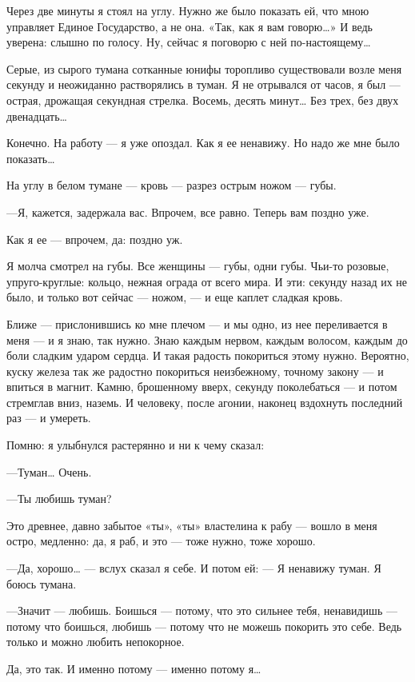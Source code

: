 \documentclass[11pt,openany]{book}
\begin{document}
Через две минуты я стоял на углу. Нужно же было показать ей, что мною управляет Единое Государство, а не она. «Так, как я вам говорю\ldots{}» И ведь уверена: слышно по голосу. Ну, сейчас я поговорю с ней по-настоящему\ldots{}

Серые, из сырого тумана сотканные юнифы торопливо существовали возле меня секунду и неожиданно растворялись в туман. Я не отрывался от часов, я был --- острая, дрожащая секундная стрелка. Восемь, десять минут\ldots{} Без трех, без двух двенадцать\ldots{}

Конечно. На работу --- я уже опоздал. Как я ее ненавижу. Но надо же мне было показать\ldots{}

На углу в белом тумане --- кровь --- разрез острым ножом --- губы.

---Я, кажется, задержала вас. Впрочем, все равно. Теперь вам поздно уже.

Как я ее --- впрочем, да: поздно уж.

Я молча смотрел на губы. Все женщины --- губы, одни губы. Чьи-то розовые, упруго-круглые: кольцо, нежная ограда от всего мира. И эти: секунду назад их не было, и только вот сейчас --- ножом, --- и еще каплет сладкая кровь.

Ближе --- прислонившись ко мне плечом --- и мы одно, из нее переливается в меня --- и я знаю, так нужно. Знаю каждым нервом, каждым волосом, каждым до боли сладким ударом сердца. И такая радость покориться этому нужно. Вероятно, куску железа так же радостно покориться неизбежному, точному закону --- и впиться в магнит. Камню, брошенному вверх, секунду поколебаться --- и потом стремглав вниз, наземь. И человеку, после агонии, наконец вздохнуть последний раз --- и умереть.

Помню: я улыбнулся растерянно и ни к чему сказал:

---Туман\ldots{} Очень.

---Ты любишь туман?

Это древнее, давно забытое «ты», «ты» властелина к рабу --- вошло в меня остро, медленно: да, я раб, и это --- тоже нужно, тоже хорошо.

---Да, хорошо\ldots{} --- вслух сказал я себе. И потом ей: --- Я ненавижу туман. Я боюсь тумана.

---Значит --- любишь. Боишься --- потому, что это сильнее тебя, ненавидишь --- потому что боишься, любишь --- потому что не можешь покорить это себе. Ведь только и можно любить непокорное.

Да, это так. И именно потому --- именно потому я\ldots{}
\end{document}
